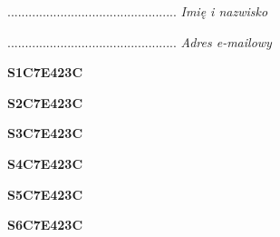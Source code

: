 \begin{turn}{90}\begin{minipage}{\linewidth} \vspace{20mm} ................................................  \textit{Imię i nazwisko}\end{minipage}\end{turn}

\begin{turn}{90}\begin{minipage}{\linewidth} \vspace{20mm} ................................................  \textit{Adres e-mailowy}\end{minipage}\end{turn}

\begin{turn}{90}\huge \begin{minipage}{\linewidth} \vspace{10mm}\textbf{S1C7E423C}\end{minipage}\end{turn}

\begin{turn}{90}\huge \begin{minipage}{\linewidth} \vspace{10mm}\textbf{S2C7E423C}\end{minipage}\end{turn}

\begin{turn}{90}\huge \begin{minipage}{\linewidth} \vspace{10mm}\textbf{S3C7E423C}\end{minipage}\end{turn}

\begin{turn}{90}\huge \begin{minipage}{\linewidth} \vspace{10mm}\textbf{S4C7E423C}\end{minipage}\end{turn}

\begin{turn}{90}\huge \begin{minipage}{\linewidth} \vspace{10mm}\textbf{S5C7E423C}\end{minipage}\end{turn}

\begin{turn}{90}\huge \begin{minipage}{\linewidth} \vspace{10mm}\textbf{S6C7E423C}\end{minipage}\end{turn}

